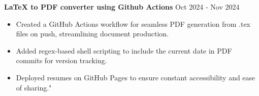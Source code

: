 \documentclass[a4paper,9pt]{extarticle}
\begin{document}
\noindent
\textbf{LaTeX to PDF converter using Github Actions} \hfill Oct 2024 - Nov 2024%
\begin{itemize}
    \item Created a GitHub Actions workflow for seamless PDF generation from .tex files on push, streamlining document production.
    \item Added regex-based shell scripting to include the current date in PDF commits for version tracking.
    \item Deployed resumes on GitHub Pages to ensure constant accessibility and ease of sharing."
\end{itemize}

\end{document}
